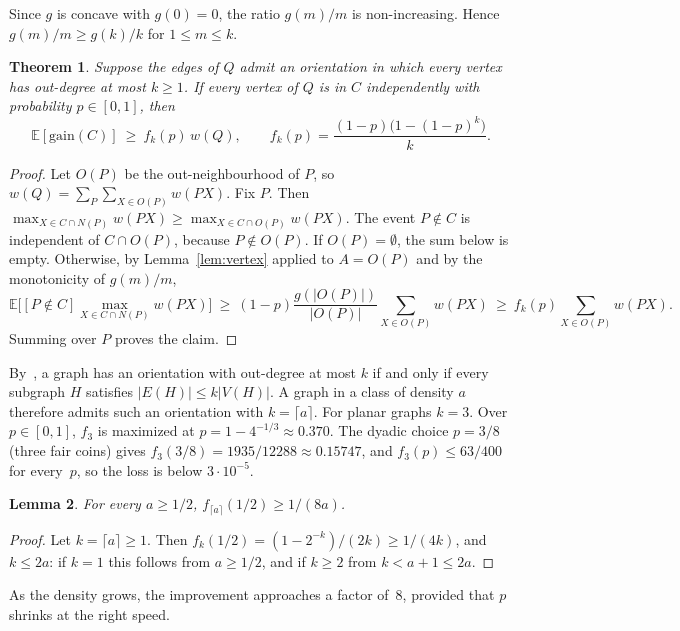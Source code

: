 \documentclass[11pt]{article}
\newtheorem{theorem}{Theorem}
\newtheorem{lemma}[theorem]{Lemma}
\theoremstyle{remark}
\newcommand{\E}{\mathbb{E}}
\begin{document}
Since $g$ is concave with $g(0)=0$, the ratio $g(m)/m$ is non-increasing. Hence $g(m)/m\ge g(k)/k$ for $1\le m\le k$.

\begin{theorem}\label{thm:level}
Suppose the edges of $Q$ admit an orientation in which every vertex has out-degree at most $k\ge1$.
If every vertex of $Q$ is in $C$ independently with probability $p\in[0,1]$, then
\[
  \E[\mathrm{gain}(C)]\ \ge\ f_k(p)\,w(Q),\qquad f_k(p)=\frac{(1-p)\big(1-(1-p)^k\big)}{k}.
\]
\end{theorem}
\begin{proof}
Let $O(P)$ be the out-neighbourhood of $P$, so $w(Q)=\sum_P\sum_{X\in O(P)}w(PX)$. Fix $P$. Then
$\max_{X\in C\cap N(P)}w(PX)\ge\max_{X\in C\cap O(P)}w(PX)$. The event $P\notin C$ is independent
of $C\cap O(P)$, because $P\notin O(P)$. If $O(P)=\emptyset$, the sum below is empty. Otherwise,
by Lemma~\ref{lem:vertex} applied to $A=O(P)$ and by the monotonicity of $g(m)/m$,
\[
  \E\Big[[P\notin C]\max_{X\in C\cap N(P)}w(PX)\Big]\ \ge\ (1-p)\frac{g(|O(P)|)}{|O(P)|}\sum_{X\in O(P)}w(PX)
  \ \ge\ f_k(p)\sum_{X\in O(P)}w(PX).
\]
Summing over $P$ proves the claim.
\end{proof}

By~\cite{H65}, a graph has an orientation with out-degree at most $k$ if and only if every
subgraph $H$ satisfies $|E(H)|\le k|V(H)|$. A graph in a class of density $a$ therefore admits such
an orientation with $k=\lceil a\rceil$. For planar graphs $k=3$. Over $p\in[0,1]$, $f_3$ is maximized at
$p=1-4^{-1/3}\approx0.370$. The dyadic choice $p=3/8$ (three fair coins) gives
$f_3(3/8)=1935/12288\approx0.15747$, and $f_3(p)\le 63/400$ for every~$p$, so the loss is below $3\cdot10^{-5}$.

\begin{lemma}\label{lem:dominates}
For every $a\ge1/2$, $f_{\lceil a\rceil}(1/2)\ge 1/(8a)$.
\end{lemma}
\begin{proof}
Let $k=\lceil a\rceil\ge1$. Then $f_k(1/2)=(1-2^{-k})/(2k)\ge 1/(4k)$, and $k\le 2a$: if $k=1$ this
follows from $a\ge1/2$, and if $k\ge2$ from $k<a+1\le 2a$.
\end{proof}

As the density grows, the improvement approaches a factor of~$8$, provided that $p$ shrinks at the
right speed.
\end{document}
